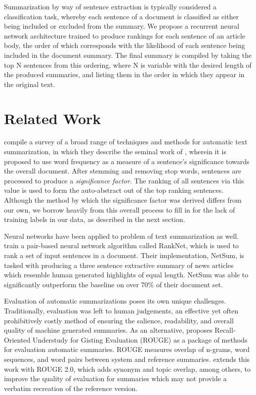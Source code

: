 \documentclass[11pt]{article}
\begin{document}
	Summarization by way of sentence extraction is typically considered a classification task, whereby each sentence of a document is classified as either being included or excluded from the summary. We propose a recurrent neural network architecture trained to produce rankings for each sentence of an article body, the order of which corresponds with the likelihood of each sentence being included in the document summary. The final summary is compiled by taking the top N sentences from this ordering, where N is variable with the desired length of the produced summaries, and listing them in the order in which they appear in the original text.
	
\section{Related Work}

	\cite{das2007} compile a survey of a broad range of techniques and methods for automatic text summarization, in which they describe the seminal work of \cite{luhn1958}, wherein it is proposed to use word frequency as a measure of a sentence's significance towards the overall document. After stemming and removing stop words, sentences are processed to produce a \emph{significance factor}. The ranking of all sentences via this value is used to form the auto-abstract out of the top ranking sentences. Although the method by which the significance factor was derived differs from our own, we borrow heavily from this overall process to fill in for the lack of training labels in our data, as described in the next section.

	Neural networks have been applied to problem of text summarization as well.\cite{svore2007} train a pair-based neural network algorithm called RankNet, which is used to rank a set of input sentences in a document. Their implementation, NetSum, is tasked with producing a three sentence extractive summary of news articles which resemble human generated highlights of equal length. NetSum was able to significantly outperform the baseline on over 70\% of their document set.

	Evaluation of automatic summarizations poses its own unique challenges. Traditionally, evaluation was left to human judgements, an effective yet often prohibitively costly method of ensuring the salience, readability, and overall quality of machine generated summaries. As an alternative, \cite{lin2004} proposes Recall-Oriented Understudy for Gisting Evaluation (ROUGE) as a package of methods for evaluation automatic summaries. ROUGE measures overlap of n-grams, word sequences, and word pairs between system and reference summaries. \cite{ganesan2015} extends this work with ROUGE 2.0, which adds synonym and topic overlap, among others, to improve the quality of evaluation for summaries which may not provide a verbatim recreation of the reference version.
\end{document}

